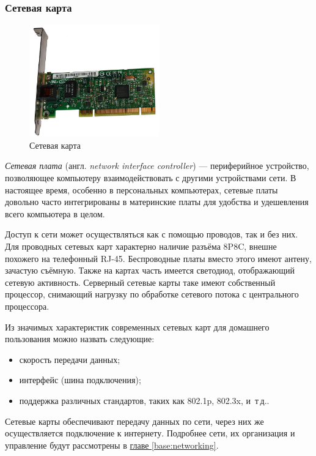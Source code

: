 \subsubsection{Сетевая карта}\label{base:introduction:components:nic}
\begin{figure}[h!]
 \centering
 \includegraphics[width=0.5\textwidth]{base/Introduction/NIC.jpg}
 \caption{Сетевая карта}
 \label{base:introduction:components:nic:nicpic}
\end{figure}
\emph{Сетевая плата} (англ. \emph{network interface controller}) --- периферийное устройство, позволяющее компьютеру взаимодействовать с другими устройствами сети.
В настоящее время, особенно в персональных компьютерах, сетевые платы довольно часто интегрированы в материнские платы для удобства и удешевления всего компьютера в целом.

Доступ к сети может осуществляться как с помощью проводов, так и без них.
Для проводных сетевых карт характерно наличие разъёма 8P8C, внешне похожего на телефонный RJ-45.
Беспроводные платы вместо этого имеют антену, зачастую съёмную. Также на картах часть имеется светодиод, отображающий сетевую активность.
Серверный сетевые карты таке имеют собственный процессор, снимающий нагрузку по обработке сетевого потока с центрального процессора.

Из значимых характеристик современных сетевых карт для домашнего пользования можно назвать следующие:
\begin{itemize}
 \item скорость передачи данных;
 \item интерфейс (шина подключения);
 \item поддержка различных стандартов, таких как 802.1p, 802.3x, и~т\,д..
\end{itemize}

Сетевые карты обеспечивают передачу данных по сети, через них же осуществляется подключение к интернету. Подробнее сети, их организация и управление будут рассмотрены в \hyperref[base:networking]{главе \ref*{base:networking}}.


